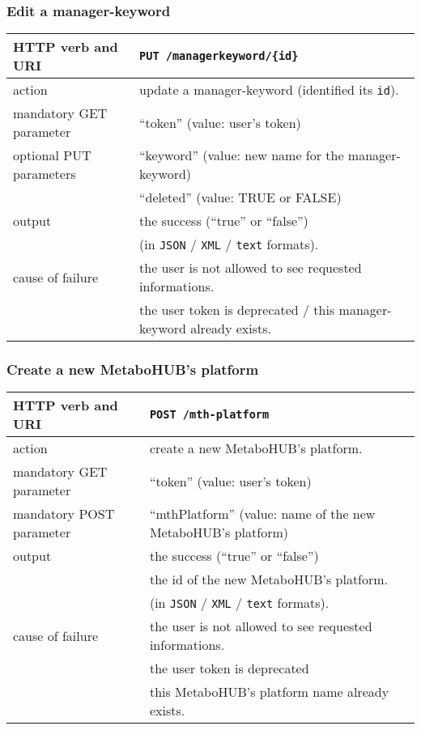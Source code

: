 \subsubsection{Edit a manager-keyword}
\begin{tabular}{ | l | l | }
	\hline
	HTTP verb and URI & \texttt{PUT /managerkeyword/\{id\}} \\
	\hline
	action & update a manager-keyword (identified \via its \texttt{id}). \\
	\hline
	mandatory GET parameter & ``token'' (value: user's token) \\
	\hline
	optional PUT parameters & ``keyword'' (value: new name for the manager-keyword) \\
	\space & ``deleted'' (value: TRUE or FALSE) \\
	\hline
	output & the success (``true'' or ``false'')  \\
	\space & (in \texttt{JSON} / \texttt{XML} / \texttt{text} formats). \\
	\hline
	cause of failure & the user is not allowed to see requested informations. \\
	\space & the user token is deprecated / this manager-keyword already exists. \\
	\hline
\end{tabular}
\newline

\subsubsection{Create a new MetaboHUB's platform}
\begin{tabular}{ | l | l | }
	\hline
	HTTP verb and URI & \texttt{POST /mth-platform} \\
	\hline
	action & create a new MetaboHUB's platform. \\
	\hline
	mandatory GET parameter & ``token'' (value: user's token) \\
	\hline
	mandatory POST parameter & ``mthPlatform'' (value: name of the new MetaboHUB's platform) \\
	\hline
	output & the success (``true'' or ``false'')  \\
	\space & the id of the new MetaboHUB's platform.  \\
	\space & (in \texttt{JSON} / \texttt{XML} / \texttt{text} formats). \\
	\hline
	cause of failure & the user is not allowed to see requested informations. \\
	\space & the user token is deprecated \\
	\space & this MetaboHUB's platform name already exists. \\
	\hline
\end{tabular}
\newline


